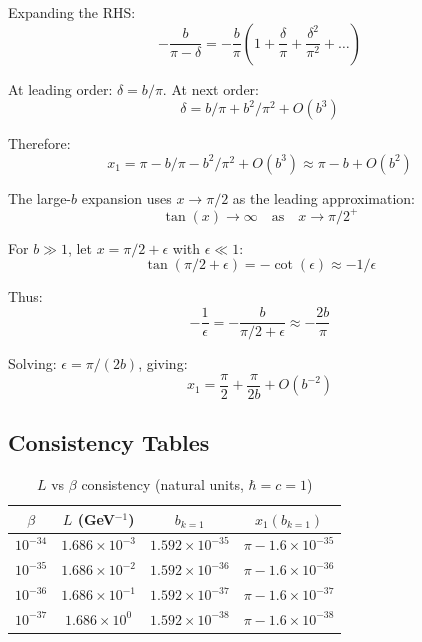 \documentclass[11pt,a4paper]{article}
\begin{document}
Expanding the RHS:
\begin{equation}
  -\frac{b}{\pi - \delta} = -\frac{b}{\pi} \left( 1 + \frac{\delta}{\pi} + \frac{\delta^2}{\pi^2} + \ldots \right)
  \label{eq:rhs-expansion}
\end{equation}

At leading order: $\delta = b/\pi$. At next order:
\begin{equation}
  \delta = b/\pi + b^2/\pi^2 + O(b^3)
  \label{eq:delta-expansion}
\end{equation}

Therefore:
\begin{equation}
  x_1 = \pi - b/\pi - b^2/\pi^2 + O(b^3) \approx \pi - b + O(b^2)
  \label{eq:x1-final-expansion}
\end{equation}

The large-$b$ expansion uses $x \to \pi/2$ as the leading approximation:
\begin{equation}
  \tan(x) \to \infty \quad \text{as} \quad x \to \pi/2^+
  \label{eq:large-b-limit}
\end{equation}

For $b \gg 1$, let $x = \pi/2 + \epsilon$ with $\epsilon \ll 1$:
\begin{equation}
  \tan(\pi/2 + \epsilon) = -\cot(\epsilon) \approx -1/\epsilon
  \label{eq:tan-cot}
\end{equation}

Thus:
\begin{equation}
  -\frac{1}{\epsilon} = -\frac{b}{\pi/2 + \epsilon} \approx -\frac{2b}{\pi}
  \label{eq:large-b-approx}
\end{equation}

Solving: $\epsilon = \pi/(2b)$, giving:
\begin{equation}
  x_1 = \frac{\pi}{2} + \frac{\pi}{2b} + O(b^{-2})
  \label{eq:x1-large-b-final}
\end{equation}

\subsection{Consistency Tables}

\begin{table}[h]
\centering
\caption{$L$ vs $\beta$ consistency (natural units, $\hbar = c = 1$)}
\label{tab:L-beta-consistency}
\begin{tabular}{cccc}
\toprule
$\beta$ & $L$ (GeV$^{-1}$) & $b_{k=1}$ & $x_1(b_{k=1})$ \\
\midrule
$10^{-34}$ & $1.686 \times 10^{-3}$ & $1.592 \times 10^{-35}$ & $\pi - 1.6 \times 10^{-35}$ \\
$10^{-35}$ & $1.686 \times 10^{-2}$ & $1.592 \times 10^{-36}$ & $\pi - 1.6 \times 10^{-36}$ \\
$10^{-36}$ & $1.686 \times 10^{-1}$ & $1.592 \times 10^{-37}$ & $\pi - 1.6 \times 10^{-37}$ \\
$10^{-37}$ & $1.686 \times 10^{0}$ & $1.592 \times 10^{-38}$ & $\pi - 1.6 \times 10^{-38}$ \\
\bottomrule
\end{tabular}
\end{table}
\end{document}
